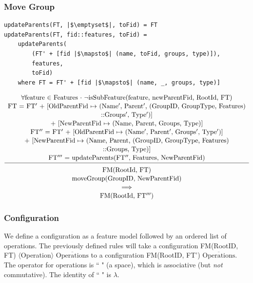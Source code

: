 \documentclass[a4paper,english]{ifimaster}
\newcommand{\variable}[1]{$\langle$#1$\rangle$}
\begin{document}
\subsubsection*{Move Group}
\begin{verbatim}
updateParents(FT, |$\emptyset$|, toFid) = FT
updateParents(FT, fid::features, toFid) = 
    updateParents(
        (FT' + [fid |$\mapsto$| (name, toFid, groups, type)]),
        features, 
        toFid)
    where FT = FT' + [fid |$\mapsto$| (name, _, groups, type)]
\end{verbatim}

\begin{equation*}
\begin{array}{c}
\text{$\forall$feature $\in$ Features $\cdot$ $\neg$isSubFeature(feature, newParentFid, RootId, FT)} \\[1pt]
\text{FT = FT$'$ + [OldParentFid $\mapsto$ (Name$'$, Parent$'$, (GroupID, GroupType, Features)} \\[1pt] 
\text{::Groups$'$, Type$'$)]} \\[1pt]
\text{+ [NewParentFid $\mapsto$ (Name, Parent, Groups, Type)]} \\[1pt]
\text{FT$''$ = FT$'$ + [OldParentFid $\mapsto$ (Name$'$, Parent$'$, Groups$'$, Type$'$)]} \\[1pt]
\text{+ [NewParentFid $\mapsto$ (Name, Parent, (GroupID, GroupType, Features)} \\[1pt] 
\text{::Groups, Type)]} \\[1pt]
\text{FT$'''$ = updateParents(FT$''$, Features, NewParentFid}) \\[1pt]
\hline\\[-7pt]
\text{FM(RootId, FT)} \\[1pt]
\text{moveGroup(GroupID, NewParentFid)}  \\[1pt]
\implies \\[1pt]
\text{FM(RootId, FT$'''$)}
\end{array}
\end{equation*}

\subsubsection*{Configuration}
We define a configuration as a feature model followed by an ordered list of operations. The previously defined rules will take a configuration FM(RootID, FT) \variable{Operation} $\overline{\text{Operations}}$ to a configuration FM(RootID, FT') $\overline{\text{Operations}}$. The operator for operations is `` " (a space), which is associative (but \textit{not} commutative). The identity of `` " is $\lambda$.
\end{document}
